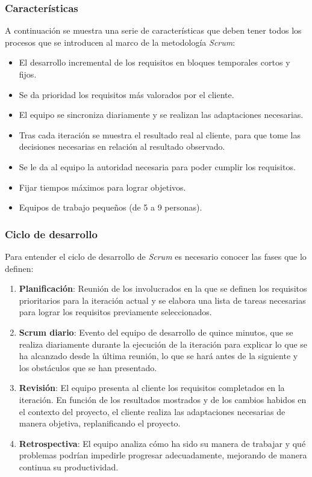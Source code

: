 \subsubsection{Características}
A continuación se muestra una serie de características que deben tener todos los procesos que se introducen al marco 
de la metodología \textit{Scrum}:
\begin{itemize}
    \item El desarrollo incremental de los requisitos en bloques temporales cortos y fijos.
    \item Se da prioridad los requisitos más valorados por el cliente.
    \item El equipo se sincroniza diariamente y se realizan las adaptaciones necesarias.
    \item Tras cada iteración se muestra el resultado real al cliente, para que tome las decisiones 
    necesarias en relación al resultado observado.
    \item Se le da al equipo la autoridad necesaria para poder cumplir los requisitos.
    \item Fijar tiempos máximos para lograr objetivos.
    \item Equipos de trabajo pequeños (de 5 a 9 personas).
\end{itemize}

\subsubsection{Ciclo de desarrollo}
Para entender el ciclo de desarrollo de \textit{Scrum} es necesario conocer las fases que lo definen:
\begin{enumerate}
    
    \item \textbf{Planificación}: Reunión de los involucrados en la que se definen los requisitos prioritarios para 
    la iteración actual y se elabora una lista de tareas necesarias para lograr los requisitos previamente seleccionados.

    \item \textbf{Scrum diario}: Evento del equipo de desarrollo de quince minutos, que se realiza diariamente durante la
    ejecución de la iteración para explicar lo que se ha alcanzado desde la última reunión, lo que se hará antes de la 
    siguiente y los obstáculos que se han presentado. 

    \item \textbf{Revisión}: El equipo presenta al cliente los requisitos completados en la iteración. En función de los 
    resultados mostrados y de los cambios habidos en el contexto del proyecto, el cliente realiza las adaptaciones 
    necesarias de manera objetiva, replanificando el proyecto.

    \item \textbf{Retrospectiva}: El equipo analiza cómo ha sido su manera de trabajar y qué problemas podrían impedirle 
    progresar adecuadamente, mejorando de manera continua su productividad.
\end{enumerate}

